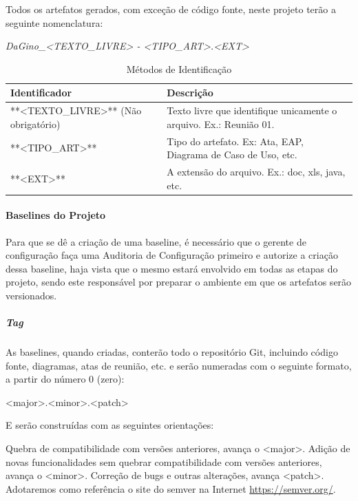  Todos os artefatos gerados, com exceção de código fonte, neste projeto terão a seguinte nomenclatura:

\begin{myprop}
\textit{DaGino\_<TEXTO\_LIVRE> - <TIPO\_ART>.<EXT>}
\end{myprop}


\begin{table}[H]
      \begin{center}
        \begin{tabular}{| l | p{6cm} |}
        \hline
        \textbf{Identificador} & \textbf{Descrição} \\ \hline
        **<TEXTO\_LIVRE>** (Não obrigatório) & Texto livre que identifique unicamente o arquivo. Ex.: Reunião 01. \\ \hline
        **<TIPO\_ART>** & Tipo do artefato. Ex: Ata, EAP, Diagrama de Caso de Uso, etc. \\ \hline
        **<EXT>** & A extensão do arquivo. Ex.: doc, xls, java, etc. \\ \hline
        \end{tabular}
      \end{center}
    \caption{Métodos de Identificação}
    \end{table}

\paragraph{Baselines do Projeto}

Para que se dê a criação de uma baseline, é necessário que o gerente de configuração faça uma Auditoria de Configuração primeiro e autorize a criação dessa baseline, haja vista que o mesmo estará envolvido em todas as etapas do projeto, sendo este responsável por preparar o ambiente em que os artefatos serão versionados.

\subparagraph{Tag}

As baselines, quando criadas, conterão todo o repositório Git, incluindo código fonte, diagramas, atas de reunião, etc. e serão numeradas com o seguinte formato, a partir do número 0 (zero):

\begin{myprop}
<major>.<minor>.<patch>
\end{myprop}

E serão construídas com as seguintes orientações:

Quebra de compatibilidade com versões anteriores, avança o <major>.
Adição de novas funcionalidades sem quebrar compatibilidade com versões anteriores, avança o <minor>.
Correção de bugs e outras alterações, avança <patch>.
Adotaremos como referência o site do semver na Internet \url{https://semver.org/}.

